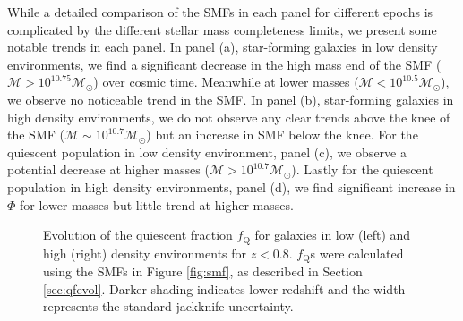 \documentclass{emulateapj}
\begin{document}
While a detailed comparison of the SMFs in each panel for different
epochs is complicated by the different stellar mass completeness limits, we present some notable trends in each panel. In panel (a), star-forming galaxies in low density environments, we find a significant decrease in the high mass end of the SMF ($\mathcal{M} > 10^{10.75} \mathcal{M}_{\odot}$) over cosmic time. Meanwhile at lower masses ($\mathcal{M} < 10^{10.5} \mathcal{M}_{\odot}$), we observe no noticeable trend in the SMF. In panel (b), star-forming galaxies in high density environments, we do not observe any clear trends above the knee of the SMF ($\mathcal{M} \sim 10^{10.7} \mathcal{M}_{\odot}$) but an increase in SMF below the knee. For the quiescent population in low density environment, panel (c), we observe a potential decrease at higher masses ($\mathcal{M} > 10^{10.7} \mathcal{M}_{\odot}$). Lastly for the quiescent population in high density environments, panel (d), we find significant increase in $\Phi$ for lower masses but little trend at higher masses. 


\begin{figure}
    \begin{center}
        \leavevmode
        \caption{Evolution of the quiescent fraction $f_{\mathrm{Q}}$ for
          galaxies in low (left) and high (right) density
          environments for $z < 0.8$. $f_{\mathrm{Q}}$s were calculated
          using the SMFs in Figure \ref{fig:smf}, as described in Section \ref{sec:qfevol}. Darker shading indicates lower redshift and the width represents the standard jackknife uncertainty.}         \label{fig:qf}
    \end{center}
\end{figure}
\end{document}
